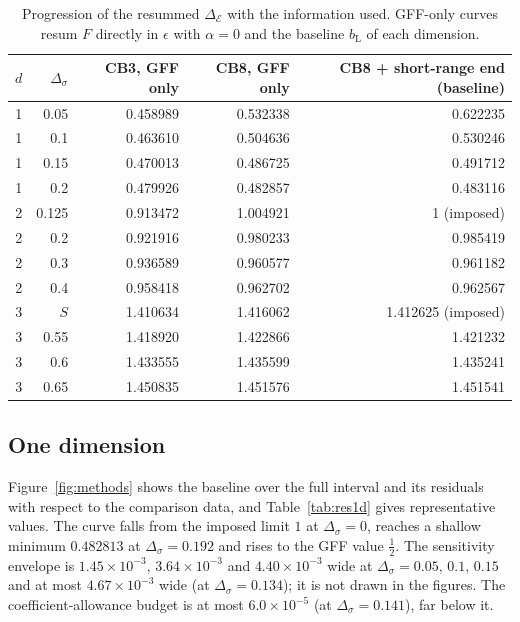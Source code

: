 \documentclass[11pt,a4paper]{article}
\numberwithin{equation}{section}
\newcommand{\De}{\Delta_{\mathcal E}}   %
\newcommand{\Ds}{\Delta_\sigma}
\newcommand{\bL}{b_{\mathrm L}}
\newcommand{\sci}[2]{#1\times10^{#2}}
\begin{document}
\begin{table}[htbp]\centering\small
\begin{tabular}{@{}c r r r r@{}}
\toprule
$d$ & $\Ds$ & CB3, GFF only & CB8, GFF only & CB8 + short-range end (baseline)\\ \midrule
1 & 0.05 & 0.458989 & 0.532338 & 0.622235\\
1 & 0.1 & 0.463610 & 0.504636 & 0.530246\\
1 & 0.15 & 0.470013 & 0.486725 & 0.491712\\
1 & 0.2 & 0.479926 & 0.482857 & 0.483116\\ \midrule
2 & 0.125 & 0.913472 & 1.004921 & 1 (imposed)\\
2 & 0.2 & 0.921916 & 0.980233 & 0.985419\\
2 & 0.3 & 0.936589 & 0.960577 & 0.961182\\
2 & 0.4 & 0.958418 & 0.962702 & 0.962567\\ \midrule
3 & $S$ & 1.410634 & 1.416062 & 1.412625 (imposed)\\
3 & 0.55 & 1.418920 & 1.422866 & 1.421232\\
3 & 0.6 & 1.433555 & 1.435599 & 1.435241\\
3 & 0.65 & 1.450835 & 1.451576 & 1.451541\\
\bottomrule
\end{tabular}
\caption{Progression of the resummed $\De$ with the information used. GFF-only curves
resum $F$ directly in $\epsilon$ with $\alpha=0$ and the baseline $\bL$ of each dimension.}
\label{tab:progression}
\end{table}

\subsection{One dimension}\label{sec:res1d}
Figure~\ref{fig:methods} shows the baseline over the full interval and its residuals
with respect to the comparison data, and Table~\ref{tab:res1d} gives representative values.
The curve falls from the imposed limit $1$ at $\Ds=0$, reaches a shallow minimum
$0.482813$ at $\Ds=0.192$ and rises to the GFF value $\frac12$. The sensitivity envelope is
$\sci{1.45}{-3}$, $\sci{3.64}{-3}$ and $\sci{4.40}{-3}$ wide at $\Ds=0.05$, $0.1$, $0.15$ and
at most $\sci{4.67}{-3}$ wide (at $\Ds=0.134$); it is not drawn in the figures. The
coefficient-allowance budget is at most $\sci{6.0}{-5}$ (at $\Ds=0.141$), far below it.
\end{document}
